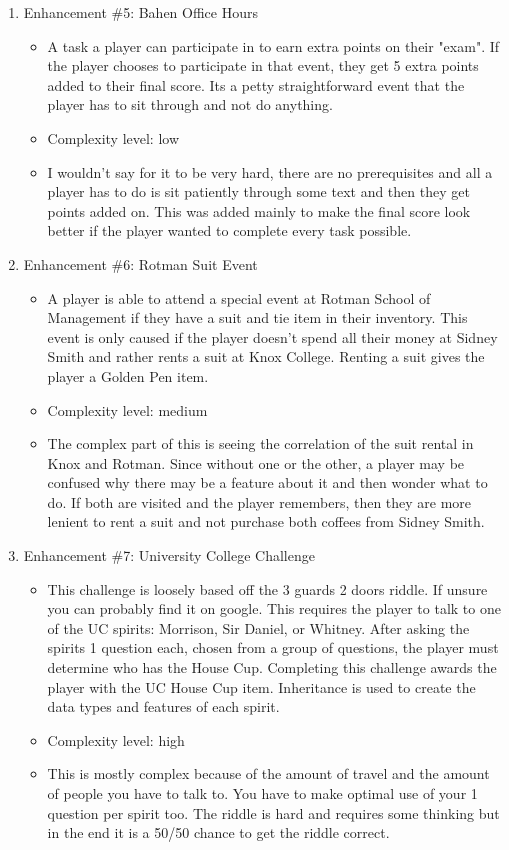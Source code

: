 \documentclass[11pt]{article}
\begin{document}
\begin{enumerate}
\item Enhancement \#5: Bahen Office Hours
	\begin{itemize}
	\item A task a player can participate in to earn extra points on their "exam". If the player chooses to participate in that event, they get 5 extra points added to their final score. Its a petty straightforward event that the player has to sit through and not do anything.
	\item Complexity level: low
	\item I wouldn't say for it to be very hard, there are no prerequisites and all a player has to do is sit patiently through some text and then they get points added on. This was added mainly to make the final score look better if the player wanted to complete every task possible.
	\end{itemize}

\item Enhancement \#6: Rotman Suit Event
	\begin{itemize}
	\item A player is able to attend a special event at Rotman School of Management if they have a suit and tie item in their inventory. This event is only caused if the player doesn't spend all their money at Sidney Smith and rather rents a suit at Knox College. Renting a suit gives the player a Golden Pen item.
	\item Complexity level: medium
	\item The complex part of this is seeing the correlation of the suit rental in Knox and Rotman. Since without one or the other, a player may be confused why there may be a feature about it and then wonder what to do. If both are visited and the player remembers, then they are more lenient to rent a suit and not purchase both coffees from Sidney Smith.
	\end{itemize}

\item Enhancement \#7: University College Challenge
	\begin{itemize}
	\item This challenge is loosely based off the 3 guards 2 doors riddle. If unsure you can probably find it on google.  This requires the player to talk to one of the UC spirits: Morrison, Sir Daniel, or Whitney. After asking the spirits 1 question each, chosen from a group of questions, the player must determine who has the House Cup. Completing this challenge awards the player with the UC House Cup item. Inheritance is used to create the data types and features of each spirit.
	\item Complexity level: high
	\item This is mostly complex because of the amount of travel and the amount of people you have to talk to. You have to make optimal use of your 1 question per spirit too. The riddle is hard and requires some thinking but in the end it is a 50/50 chance to get the riddle correct.
	\end{itemize}


\end{enumerate}
\end{document}

